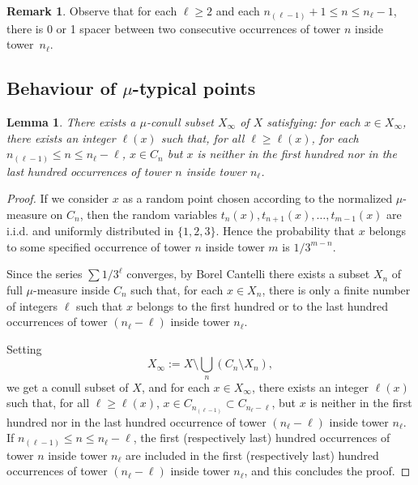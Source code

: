\documentclass[10pt]{amsart}
\newtheorem{lemm}[theo]{Lemma}\newtheorem{prop}[theo]{Proposition}\newtheorem{coro}[theo]{Corollary}\newtheorem{conj}[theo]{Conjecture}
\theoremstyle{definition}\newtheorem{defi}[theo]{Definition}\newtheorem{rema}[theo]{Remark}\newtheorem{exam}[theo]{Example}\newtheorem{exem}[theo]{Example}\newtheorem{nota}[theo]{Notation}
\newcommand{\egdef}{:=}
\begin{document}
\begin{rema}\label{remark:01spacer}
Observe that for each $\ell\ge2$ and each $n_{(\ell-1)}+1\le n\le n_\ell - 1$, there is 0 or 1 spacer between two consecutive occurrences of tower $n$ inside tower~$n_\ell$.
\end{rema}

\subsection{Behaviour of \texorpdfstring{$\mu$}{mu}-typical points}
\label{sec:typical}

\begin{lemm}\label{lemma:Xinfty}
There exists a $\mu$-conull subset $X_\infty$ of $X$ satisfying: for each $x\in X_\infty$, there exists an integer $\ell(x)$ such that, for all $\ell\ge
\ell(x)$, for each $n_{(\ell-1)} \le n \le n_\ell -\ell$, $x\in C_n$ but $x$ is neither in the first hundred nor in the last hundred occurrences of tower $n$ inside tower $n_\ell$.
\end{lemm}

\begin{proof}
If we consider $x$ as a random point chosen according to the normalized $\mu$-measure on $C_n$, then the random variables $t_n(x),t_{n+1}(x),\ldots,t_{m-1}(x)$ are i.i.d. and uniformly distributed in $\{1,2,3\}$. Hence the probability that $x$ belongs to some specified occurrence of tower $n$ inside tower $m$ is $1/3^{m-n}$.

Since the series $\sum 1/3^\ell$ converges, by Borel Cantelli there exists a subset $X_n$ of full $\mu$-measure inside $C_n$ such that, for each $x\in X_n$, there is only a finite number of integers $\ell$ such that $x$ belongs to the first hundred or to the last hundred occurrences of tower $(n_\ell-\ell)$ inside tower $n_\ell$.

Setting
\[
X_\infty \egdef X\setminus \bigcup_n \left(C_n\setminus X_n\right),
\]
we get a conull subset of $X$, and for each $x\in X_\infty$, there exists an integer $\ell(x)$ such that, for all $\ell\ge \ell(x)$, $x\in C_{n_{(\ell-1)}}\subset C_{n_\ell-\ell}$, but $x$ is neither in the first hundred nor in the last hundred occurrence of tower $(n_\ell-\ell)$ inside tower $n_\ell$. If $n_{(\ell-1)} \le n \le n_\ell -\ell$, the first (respectively last) hundred occurrences of tower $n$ inside tower $n_\ell$ are included in the first (respectively last) hundred occurrences of tower $(n_\ell-\ell)$ inside tower $n_\ell$, and this concludes the proof.
\end{proof}
\end{document}
